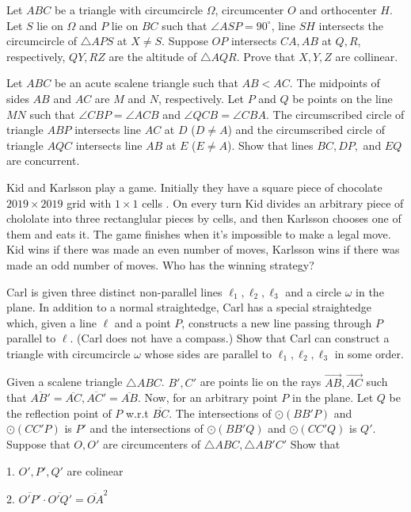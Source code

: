 \documentclass[11pt]{scrartcl}
\begin{document}
\begin{problem}[3417358984411200361]
Let $ABC$ be a triangle with circumcircle $\Omega$, circumcenter $O$ and orthocenter $H$. Let $S$ lie on $\Omega$ and $P$ lie on $BC$ such that $\angle ASP=90^\circ$, line $SH$ intersects the circumcircle of $\triangle APS$ at $X\neq S$. Suppose $OP$ intersects $CA,AB$ at $Q,R$, respectively, $QY,RZ$ are the altitude of $\triangle AQR$. Prove that $X,Y,Z$ are collinear.
\end{problem}
\begin{problem}[620564216459483]
Let $ABC$ be an acute scalene triangle such that $AB <AC$. The midpoints of sides $AB$ and $AC$ are $M$ and $N$, respectively. Let $P$ and $Q$ be points on the line $MN$ such that $\angle CBP = \angle ACB$ and $\angle QCB = \angle CBA$. The circumscribed circle of triangle $ABP$ intersects line $AC$ at $D$ ($D\ne A$) and the circumscribed circle of triangle $AQC$ intersects line $AB$ at $E$ ($E \ne A$). Show that lines $BC, DP,$ and $EQ$ are concurrent.
\end{problem}
\begin{problem}[300334293164389]
	Kid and Karlsson play a game. Initially they have a square piece of chocolate $2019\times 2019$ grid with $1\times 1$ cells . On every turn Kid divides an arbitrary piece of chololate into three rectanglular pieces by cells, and then Karlsson chooses one of them and eats it. The game finishes when it's impossible to make a legal move. Kid wins if there was made an even number of moves, Karlsson wins if there was made an odd number of moves.
Who has the winning strategy?
\end{problem}
\begin{problem}[6306108494297192985]
Carl is given three distinct non-parallel lines $\ell_1, \ell_2, \ell_3$ and a circle $\omega$ in the plane. In addition to a normal straightedge, Carl has a special straightedge which, given a line $\ell$ and a point $P$, constructs a new line passing through $P$ parallel to $\ell$. (Carl does not have a compass.) Show that Carl can construct a triangle with circumcircle $\omega$ whose sides are parallel to $\ell_1,\ell_2,\ell_3$ in some order.
\end{problem}
\begin{problem}[1810915585111530473]
	Given a scalene triangle $ \triangle ABC $. $ B', C' $ are points lie on the rays $ \overrightarrow{AB}, \overrightarrow{AC}  $ such that $ \overline{AB'} = \overline{AC}, \overline{AC'} = \overline{AB} $. Now, for an arbitrary point $ P $ in the plane. Let $ Q $ be the reflection point of $ P $ w.r.t $ \overline{BC} $. The intersections of $ \odot{\left(BB'P\right)} $ and $ \odot{\left(CC'P\right)} $ is $ P' $ and the intersections of $ \odot{\left(BB'Q\right)} $ and $ \odot{\left(CC'Q\right)} $ is $ Q' $. Suppose that $ O, O' $ are circumcenters of $ \triangle{ABC}, \triangle{AB'C'} $ Show that

1. $ O', P', Q' $ are colinear

2. $  \overline{O'P'} \cdot  \overline{O'Q'} = \overline{OA}^{2} $
\end{problem}
\end{document}
